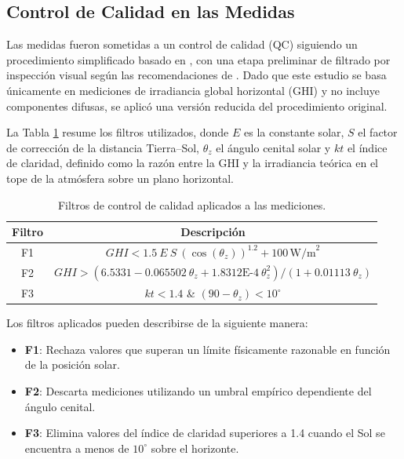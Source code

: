 \subsection{Control de Calidad en las Medidas}

Las medidas fueron sometidas a un control de calidad (QC) siguiendo un procedimiento simplificado basado en \cite{Nollas2023}, con una etapa preliminar de filtrado por inspección visual según las recomendaciones de \cite{abal2020}. Dado que este estudio se basa únicamente en mediciones de irradiancia global horizontal (GHI) y no incluye componentes difusas, se aplicó una versión reducida del procedimiento original. 

La Tabla \ref{tab:qc} resume los filtros utilizados, donde $E$ es la constante solar, $S$ el factor de corrección de la distancia Tierra–Sol, $\theta_z$ el ángulo cenital solar y $kt$ el índice de claridad, definido como la razón entre la GHI y la irradiancia teórica en el tope de la atmósfera sobre un plano horizontal.\\

\begin{table}[h!]
\caption{Filtros de control de calidad aplicados a las mediciones.}
\label{tab:qc}
\centering
\resizebox{\linewidth}{!} {
\def\arraystretch{1.5}
\begin{tabular}{cc}
\hline
\textbf{Filtro} & \textbf{Descripción}\\ 
\hline
F1 & $GHI < 1.5~E~S~(\cos(\theta_z))^{1.2} + 100 \, \text{W/m}^2$  \\
F2 & $GHI > (6.5331 - 0.065502~\theta_z + 1.8312\text{E-4}~\theta_z^2)/(1 + 0.01113~\theta_z)$ \\
F3 & $kt < 1.4$ \& $ (90-\theta_z) < 10^\circ$  \\
\hline
\end{tabular}}
\end{table}

Los filtros aplicados pueden describirse de la siguiente manera:

\begin{itemize}
    \item \textbf{F1}: Rechaza valores que superan un límite físicamente razonable en función de la posición solar.
    \item \textbf{F2}: Descarta mediciones utilizando un umbral empírico dependiente del ángulo cenital.
    \item \textbf{F3}: Elimina valores del índice de claridad superiores a 1.4 cuando el Sol se encuentra a menos de $10^\circ$ sobre el horizonte.
\end{itemize}

